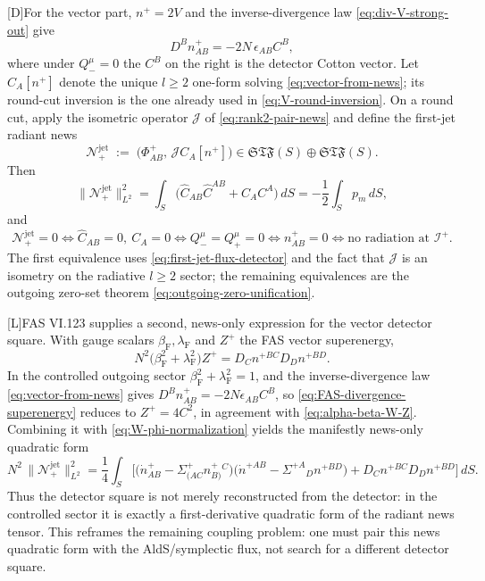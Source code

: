 \documentclass[11pt,a4paper]{article}
\newcommand{\scri}{\mathscr{I}}
\newcommand{\cN}{\mathcal{N}}
\newcommand{\statusL}{\textsf{[L]}}
\newcommand{\statusD}{\textsf{[D]}}
\begin{document}
\statusD For the vector part, \(n^+=2V\) and the inverse-divergence law \eqref{eq:div-V-strong-out} give
\begin{equation}\label{eq:vector-from-news}
  D^B n^+_{AB}
  =
  -2N\,\epsilon_{AB}C^B ,
\end{equation}
where under \(Q_-^\mu=0\) the \(C^B\) on the right is the detector Cotton vector.  Let \(C_A[n^+]\) denote the unique \(l\ge2\) one-form solving \eqref{eq:vector-from-news}; its round-cut inversion is the one already used in \eqref{eq:V-round-inversion}.  On a round cut, apply the isometric operator \(\mathcal J\) of \eqref{eq:rank2-pair-news} and define the first-jet radiant news
\begin{equation}\label{eq:first-jet-news}
  \cN^{\mathrm{jet}}_+
  \;:=\;
  \big(\Phi^+_{AB},\,\mathcal J C_A[n^+]\big)
  \in
  \mathfrak{STF}(S)\oplus\mathfrak{STF}(S) .
\end{equation}
Then
\begin{equation}\label{eq:first-jet-square}
  \|\cN^{\mathrm{jet}}_+\|_{L^2}^2
  =
  \int_S\big(
  \hat C_{AB}\hat C^{AB}+C_AC^A
  \big)\,dS
  =
  -\frac12\int_S p_m\,dS ,
\end{equation}
and
\begin{equation}\label{eq:first-jet-zero}
  \cN^{\mathrm{jet}}_+=0
  \iff
  \hat C_{AB}=0,\ C_A=0
  \iff
  Q_-^\mu=Q_+^\mu=0
  \iff
  n^+_{AB}=0
  \iff
  \text{no radiation at }\scri^+ .
\end{equation}
The first equivalence uses \eqref{eq:first-jet-flux-detector} and the fact that \(\mathcal J\) is an isometry on the radiative \(l\ge2\) sector; the remaining equivalences are the outgoing zero-set theorem \eqref{eq:outgoing-zero-unification}.

\statusL FAS VI.123 supplies a second, news-only expression for the vector detector square.  With gauge scalars \(\beta_{\mathrm F},\lambda_{\mathrm F}\) and \(Z^+\) the FAS vector superenergy,
\begin{equation}\label{eq:FAS-divergence-superenergy}
  N^2\big(\beta_{\mathrm F}^2+\lambda_{\mathrm F}^2\big)Z^+
  =
  D_Cn^{+B C}D_Dn^{+BD} .
\end{equation}
In the controlled outgoing sector \(\beta_{\mathrm F}^2+\lambda_{\mathrm F}^2=1\), and the inverse-divergence law \eqref{eq:vector-from-news} gives \(D^Bn^+_{AB}=-2N\epsilon_{AB}C^B\), so \eqref{eq:FAS-divergence-superenergy} reduces to \(Z^+=4C^2\), in agreement with \eqref{eq:alpha-beta-W-Z}.  Combining it with \eqref{eq:W-phi-normalization} yields the manifestly news-only quadratic form
\begin{equation}\label{eq:jet-news-only-square}
  N^2\,\|\cN^{\mathrm{jet}}_+\|_{L^2}^2
  =
  \frac14\int_S
  \Big[
    \big(\dot n^+_{AB}-\Sigma^+_{(AC}n^+_{B)}{}^C\big)
    \big(\dot n^{+AB}-\Sigma^{+A}{}_{D}n^{+BD}\big)
    +
    D_Cn^{+B C}D_Dn^{+BD}
  \Big]\,dS .
\end{equation}
Thus the detector square is not merely reconstructed from the detector: in the controlled sector it is exactly a first-derivative quadratic form of the radiant news tensor.  This reframes the remaining coupling problem: one must pair this news quadratic form with the AldS/symplectic flux, not search for a different detector square.
\end{document}

